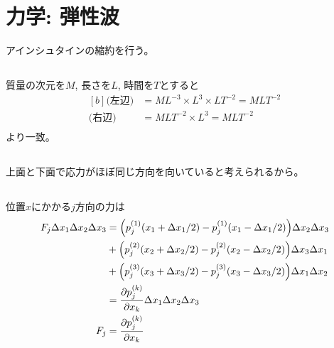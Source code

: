 \documentclass[../ap_2021.tex]{subfiles}
\begin{document}
\setcounter{chapter}{1}
\chapter{力学: 弾性波}
アインシュタインの縮約を行う。
\section{}
質量の次元を\(M\), 長さを\(L\), 時間を\(T\)とすると
\begin{equation}\begin{aligned}[b]
    \text{(左辺)}&=ML^{-3}\times L^3\times LT^{-2}=MLT^{-2}\\
    \text{(右辺)}&=MLT^{-2}\times L^3=MLT^{-2}\\
\end{aligned}\end{equation}
より一致。

\section{}
上面と下面で応力がほぼ同じ方向を向いていると考えられるから。

\section{}
位置\(x\)にかかる\(j\)方向の力は
\begin{equation}\begin{aligned}[b]
    F_j\Delta x_1\Delta x_2\Delta x_3
    &=\qty(p_j^{(1)}(x_1+\Delta x_1/2)-p_j^{(1)}(x_1-\Delta x_1/2))\Delta x_2 \Delta x_3\\
    &+\qty(p_j^{(2)}(x_2+\Delta x_2/2)-p_j^{(2)}(x_2-\Delta x_2/2))\Delta x_3 \Delta x_1\\
    &+\qty(p_j^{(3)}(x_3+\Delta x_3/2)-p_j^{(3)}(x_3-\Delta x_3/2))\Delta x_1 \Delta x_2\\
    &= \pdv{p_j^{(k)}}{x_k}\Delta x_1\Delta x_2\Delta x_3\\
    F_j &= \pdv{p_j^{(k)}}{x_k}
\end{aligned}\end{equation}
\end{document}
